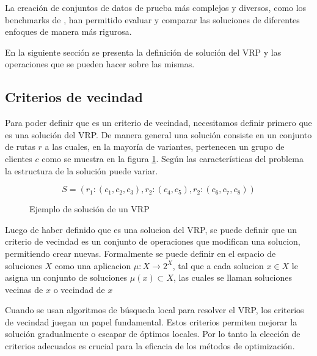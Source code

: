\documentclass{article}
\begin{document}
La creación de conjuntos de datos de prueba más complejos y diversos, como los benchmarks de \cite{ref10}, han permitido evaluar y comparar las soluciones de diferentes enfoques de manera más rigurosa.

En la siguiente sección se presenta la definición de solución del VRP y las operaciones que se pueden hacer sobre las mismas.

\subsection{Criterios de vecindad}
Para poder definir que es un criterio de vecindad, necesitamos definir primero que es una solución del VRP. De manera general una solución consiste en un conjunto de rutas $r$ a las cuales, en la mayoría de variantes, pertenecen un grupo de clientes $c$ como se muestra en la figura \ref{fig:solution}. Según las características del problema la estructura de la solución puede variar.

\begin{figure} [h]
\centering
\[
S=(r_1:(c_1,c_2,c_3),
r_2:(c_4,c_5),
r_2:(c_6,c_7,c_8))
\]
\caption{Ejemplo de solución de un VRP}
\label{fig:solution}
\end{figure}

Luego de haber definido que es una solucion del VRP, se puede definir que un criterio de vecindad es un conjunto de operaciones que modifican una solucion, permitiendo crear nuevas. Formalmente se puede definir en el espacio de soluciones $X$ como una aplicacion $\mu:X \rightarrow 2^X$, tal que a cada solucion $x \in X$ le asigna un conjunto de soluciones $\mu(x) \subset X$, las cuales se llaman soluciones vecinas de $x$ o vecindad de $x$

Cuando se usan algoritmos de búsqueda local para resolver el VRP, los criterios de vecindad juegan un papel fundamental. Estos criterios permiten mejorar la solución gradualmente o escapar de óptimos locales. Por lo tanto la elección de criterios adecuados es crucial para la eficacia de los métodos de optimización.
\end{document}
